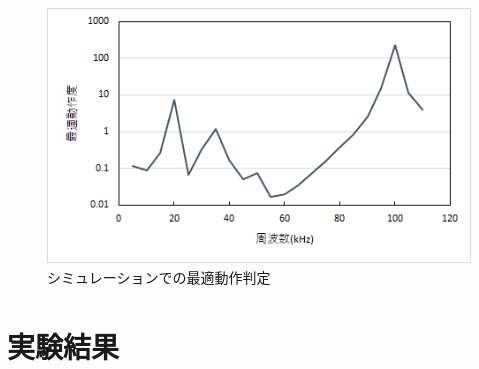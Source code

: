 \documentclass[12pt]{jarticle}
\begin{document}
 \begin{figure}[H]
	\centering
	\includegraphics[scale=1]{saitekidousasimu.png}
	\caption{シミュレーションでの最適動作判定}
	\label{fig:simulatesaiteki}
\end{figure}
\clearpage
\section{実験結果}
\end{document}
